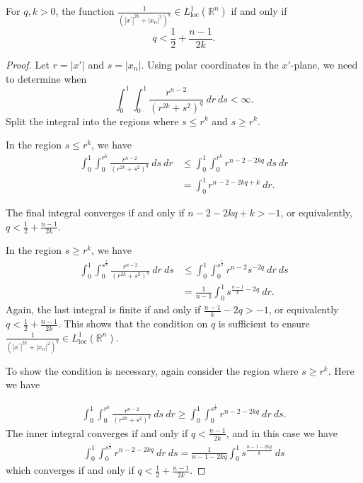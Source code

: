 \documentclass[10pt,a4paper]{amsart}
\newcommand{\R}{\mathbb{R}}
\begin{document}
\begin{lemma}\label{integral}
For $q, k >0$, the function $\frac{ 1}{(|x^\prime|^{2k} + |x_n|^2)^q } \in L^1_{\mathrm{loc}} ( \R^n)$ if and only if $$ q< \frac 12 + \frac{ n-1}{2k} .$$


\end{lemma} 

\begin{proof} 

Let $r = |x'|$ and $s = |x_n|$.  Using polar coordinates in the $x'$-plane, we need to determine when
$$ \int_0^1 \int_0^1 \frac{r^{n-2}} {( r^{2k} + s^2 )^q} \: dr \: ds < \infty.$$
Split the integral into the regions where $s\leq r^k $ and $s\geq r^k $. 


In the region $s \leq r^k$, we have 
\begin{align*} \int_0^1 \int _0^{r^k} \frac{ r^{n-2}} { ( r^{2k} + s^ 2 ) ^q } \: ds \: dr &\leq \int_0^1 \int _0^{r^k} r^{n-2-2kq } \: ds \: dr\\
& = \int_0^1 r^{n-2-2kq+k} \: dr. 
\end{align*}

The final integral converges if and only if $n-2-2kq + k > -1$, or equivalently, $q < \frac 12 + \frac{n-1}{2k} .$

In the region $s\geq r^k $, we have 
\begin{align*} \int_0^1 \int _0^{s^{\frac1k}} \frac{ r^{n-2}} { ( r^{2k} + s^ 2 ) ^q } \: dr \: ds &\leq \int_0^1 \int _0^{s^{\frac 1k} } r^{n-2 } s^{-2q}  \: dr \: ds\\
& = \frac{1}{n-1} \int_0^1 s^{\frac{n-1}{k}-2q } \: dr. 
\end{align*}
Again, the last integral is finite if and only if $\frac{ n-1}{k} - 2q > -1$, or equivalently $q < \frac 12 + \frac {n-1}{2k}.$ This shows that the condition on $q$ is sufficient to ensure $\frac{ 1}{(|x^\prime|^{2k} + |x_n|^2)^q } \in L^1_{\mathrm{loc}} ( \R^n)$. 

To show the condition is necessary, again consider the region where $s\geq r^k$. Here we have 

\begin{align*} \int_0^1 \int _0^{r^k} \frac{ r^{n-2}} { ( r^{2k} + s^ 2 ) ^q } \: ds \: dr \geq \int _0^1 \int _0^{s^{\frac 1k} } r^{n-2 - 2kq } \: dr \: ds.
\end{align*} 
The inner integral converges if and only if $q < \frac { n-1} {2k} $, and in this case we have 
\begin{align*} 
\int _0^1 \int _0^{s^{\frac 1k} } r^{n-2 - 2kq } \: dr \: ds = \frac{ 1}{n-1-2kq } \int_0^1 s^{\frac{ n-1 - 2kq }{k}} \: ds 
\end{align*} 
which converges if and only if $q < \frac 12 + \frac {n-1}{2k}.$
\end{proof} 
\end{document}
